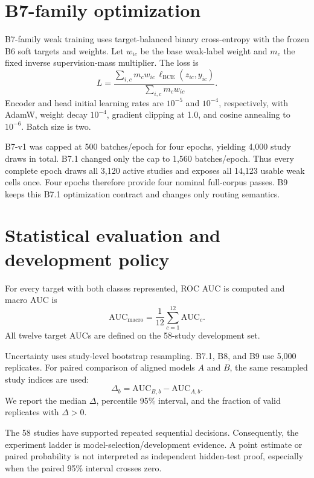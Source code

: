 \documentclass[preprint,12pt]{elsarticle}
\begin{document}
\section{B7-family optimization}
\label{sec:optimization}

B7-family weak training uses target-balanced binary cross-entropy with the frozen B6 soft targets and weights. Let $w_{ic}$ be the base weak-label weight and $m_c$ the fixed inverse supervision-mass multiplier. The loss is
\begin{equation}
L=\frac{\sum_{i,c}m_cw_{ic}\,\ell_{\mathrm{BCE}}(z_{ic},y_{ic})}
{\sum_{i,c}m_cw_{ic}}.
\end{equation}
Encoder and head initial learning rates are $10^{-5}$ and $10^{-4}$, respectively, with AdamW, weight decay $10^{-4}$, gradient clipping at 1.0, and cosine annealing to $10^{-6}$. Batch size is two.

B7-v1 was capped at 500 batches/epoch for four epochs, yielding 4,000 study draws in total. B7.1 changed only the cap to 1,560 batches/epoch. Thus every complete epoch draws all 3,120 active studies and exposes all 14,123 usable weak cells once. Four epochs therefore provide four nominal full-corpus passes. B9 keeps this B7.1 optimization contract and changes only routing semantics.

\section{Statistical evaluation and development policy}
\label{sec:evaluation}

For every target with both classes represented, ROC AUC is computed and macro AUC is
\begin{equation}
\mathrm{AUC}_{\mathrm{macro}}=\frac{1}{12}\sum_{c=1}^{12}\mathrm{AUC}_c.
\end{equation}
All twelve target AUCs are defined on the 58-study development set.

Uncertainty uses study-level bootstrap resampling. B7.1, B8, and B9 use 5,000 replicates. For paired comparison of aligned models $A$ and $B$, the same resampled study indices are used:
\begin{equation}
\Delta_b=\mathrm{AUC}_{B,b}-\mathrm{AUC}_{A,b}.
\end{equation}
We report the median $\Delta$, percentile 95\% interval, and the fraction of valid replicates with $\Delta>0$.

The 58 studies have supported repeated sequential decisions. Consequently, the experiment ladder is model-selection/development evidence. A point estimate or paired probability is not interpreted as independent hidden-test proof, especially when the paired 95\% interval crosses zero.
\end{document}
